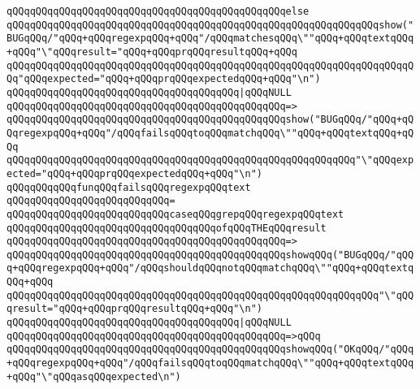 \verb|qQQqqQQqqQQqqQQqqQQqqQQqqQQqqQQqqQQqqQQqqQQqqQQqelse|\newline
\verb|qQQqqQQqqQQqqQQqqQQqqQQqqQQqqQQqqQQqqQQqqQQqqQQqqQQqqQQqqQQqqQQqshow("BUGqQQq/"qQQq+qQQqregexpqQQq+qQQq"/qQQqmatchesqQQq\""qQQq+qQQqtextqQQq+qQQq"\"qQQqresult="qQQq+qQQqprqQQqresultqQQq+qQQq|\newline
\verb|qQQqqQQqqQQqqQQqqQQqqQQqqQQqqQQqqQQqqQQqqQQqqQQqqQQqqQQqqQQqqQQqqQQqqQQq"qQQqexpected="qQQq+qQQqprqQQqexpectedqQQq+qQQq"\n")|\newline
\newline
\verb|qQQqqQQqqQQqqQQqqQQqqQQqqQQqqQQqqQQqqQQq|\verb#|qQQqNULL#\newline
\verb|qQQqqQQqqQQqqQQqqQQqqQQqqQQqqQQqqQQqqQQqqQQqqQQq=>|\newline
\verb|qQQqqQQqqQQqqQQqqQQqqQQqqQQqqQQqqQQqqQQqqQQqqQQqshow("BUGqQQq/"qQQq+qQQqregexpqQQq+qQQq"/qQQqfailsqQQqtoqQQqmatchqQQq\""qQQq+qQQqtextqQQq+qQQq|\newline
\verb|qQQqqQQqqQQqqQQqqQQqqQQqqQQqqQQqqQQqqQQqqQQqqQQqqQQqqQQqqQQq"\"qQQqexpected="qQQq+qQQqprqQQqexpectedqQQq+qQQq"\n")|\newline
\newline
\verb|qQQqqQQqqQQqfunqQQqfailsqQQqregexpqQQqtext|\newline
\verb|qQQqqQQqqQQqqQQqqQQqqQQqqQQq=|\newline
\verb|qQQqqQQqqQQqqQQqqQQqqQQqqQQqcaseqQQqgrepqQQqregexpqQQqtext|\newline
\verb|qQQqqQQqqQQqqQQqqQQqqQQqqQQqqQQqqQQqofqQQqTHEqQQqresult|\newline
\verb|qQQqqQQqqQQqqQQqqQQqqQQqqQQqqQQqqQQqqQQqqQQqqQQq=>|\newline
\verb|qQQqqQQqqQQqqQQqqQQqqQQqqQQqqQQqqQQqqQQqqQQqqQQqshowqQQq("BUGqQQq/"qQQq+qQQqregexpqQQq+qQQq"/qQQqshouldqQQqnotqQQqmatchqQQq\""qQQq+qQQqtextqQQq+qQQq|\newline
\verb|qQQqqQQqqQQqqQQqqQQqqQQqqQQqqQQqqQQqqQQqqQQqqQQqqQQqqQQqqQQqqQQq"\"qQQqresult="qQQq+qQQqprqQQqresultqQQq+qQQq"\n")|\newline
\verb|qQQqqQQqqQQqqQQqqQQqqQQqqQQqqQQqqQQqqQQq|\verb#|qQQqNULL#\newline
\verb|qQQqqQQqqQQqqQQqqQQqqQQqqQQqqQQqqQQqqQQqqQQqqQQq=>qQQq|\newline
\verb|qQQqqQQqqQQqqQQqqQQqqQQqqQQqqQQqqQQqqQQqqQQqqQQqshowqQQq("OKqQQq/"qQQq+qQQqregexpqQQq+qQQq"/qQQqfailsqQQqtoqQQqmatchqQQq\""qQQq+qQQqtextqQQq+qQQq"\"qQQqasqQQqexpected\n")|\newline
\newline
